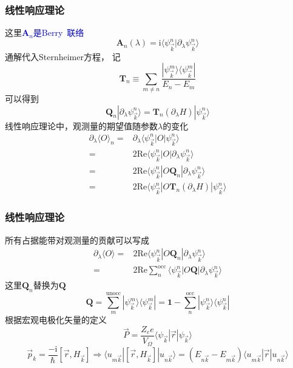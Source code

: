 \frame
{
	\frametitle{线性响应理论}
	这里\textcolor{blue}{$\mathbf{A}_n$是\textrm{Berry~}联络}
	\begin{displaymath}
		\mathbf{A}_n(\lambda)=\mathrm{i}\langle\psi_{\vec k}^{n}|\partial_{\lambda}\psi_{\vec k}^{n}\rangle
	\end{displaymath}
	通解代入\textrm{Sternheimer}方程，
记
\begin{displaymath}
	\mathbf{T}_n\equiv\sum_{m\neq n}\dfrac{|\psi_{\vec k}^{m}\rangle\langle\psi_{\vec k}^{m}|}{E_n-E_m}
\end{displaymath}
	可以得到
	\begin{displaymath}
		\mathbf{Q}_n|\partial_{\lambda}\psi_{\vec k}^{n}\rangle=\mathbf{T}_n(\partial_{\lambda}H)|\psi_{\vec k}^{n}\rangle
	\end{displaymath}
	线性响应理论中，观测量的期望值随参数$\lambda$的变化
	\begin{displaymath}
		\begin{aligned}
			\partial_{\lambda}\langle O\rangle_n=&\partial_{\lambda}\langle\psi_{\vec k}^{n}|O|\psi_{\vec k}^{n}\rangle\\
			=&2\mathrm{Re}\langle\psi_{\vec k}^{n}|O|\partial_{\lambda}\psi_{\vec k}^{n}\rangle\\
			=&2\mathrm{Re}\langle\psi_{\vec k}^{n}|O\mathbf{Q}_n|\partial_{\lambda}\psi_{\vec k}^{n}\rangle\\
			=&2\mathrm{Re}\langle\psi_{\vec k}^{n}|O\mathbf{T}_n(\partial_{\lambda}H)|\psi_{\vec k}^{n}\rangle
		\end{aligned}
	\end{displaymath}
}

\frame
{
	\frametitle{线性响应理论}
	所有占据能带对观测量的贡献可以写成
	\begin{displaymath}
		\begin{aligned}
			\partial_{\lambda}\langle O\rangle=&2\mathrm{Re}\langle\psi_{\vec k}^{n}|O\mathbf{Q}_n|\partial_{\lambda}\psi_{\vec k}^{n}\rangle\\
			=&2\mathrm{Re}\sum_{n}^{\mathrm{occ}}\langle\psi_{\vec k}^{n}|O\mathbf{Q}|\partial_{\lambda}\psi_{\vec k}^{n}\rangle
		\end{aligned}
	\end{displaymath}
	这里$\mathbf{Q}_n$替换为$\mathbf{Q}$
	\begin{displaymath}
		\mathbf{Q}=\sum_m^{\mathrm{unocc}}|\psi_{\vec k}^{m}\rangle\langle\psi_{\vec k}^{m}|=\mathbf{1}-\sum_{n}^{\mathrm{occ}}|\psi_{\vec k}^{n}\rangle\langle\psi_{\vec k}^{n}|
	\end{displaymath}
	根据宏观电极化矢量的定义
	\begin{displaymath}
		\vec P=\dfrac{Z_ee}{V_{\Omega}}\langle\psi_{\vec k}|\vec r|\psi_{\vec k}\rangle
	\end{displaymath}
	\begin{displaymath}
		\vec p_k=\dfrac{-\mathrm{i}}{\hbar}[\vec r,H_{\vec k}]\Longrightarrow\langle u_{m\vec k}|[\vec r,H_{\vec k}]|u_{n\vec k}\rangle=(E_{n\vec k}-E_{m\vec k})\langle u_{m\vec k}|\vec r|u_{n\vec k}\rangle
	\end{displaymath}
}

